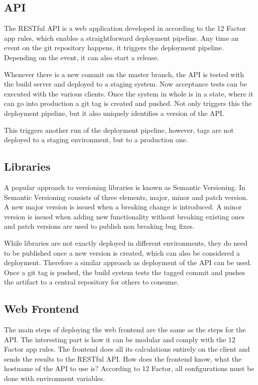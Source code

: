 \subsection{API}

The RESTful API is a web application developed in according to the 12 Factor
app rules, which enables a straightforward deployment pipeline. Any time an
event on the git repository happens, it triggers the deployment pipeline.
Depending on the event, it can also start a release.

Whenever there is a new commit on the master branch, the API is tested with the
build server and deployed to a staging system. Now acceptance tests can be
executed with the various clients. Once the system in whole is in a state,
where it can go into production a git tag is created and pushed. Not only
triggers this the deployment pipeline, but it also uniquely identifies a
version of the API.

This triggers another run of the deployment pipeline, however, tags are not
deployed to a staging environment, but to a production one.

\subsection{Libraries}

A popular approach to versioning libraries is known as Semantic Versioning. In
Semantic Versioning consists of three elements, major, minor and patch version.
A new major version is issued when a breaking change is introduced. A minor
version is issued when adding new functionality without breaking existing ones
and patch versions are used to publish non breaking bug fixes.

While libraries are not exactly deployed in different environments, they do
need to be published once a new version is created, which can also be
considered a deployment. Therefore a similar approach as deployment of the API
can be used. Once a git tag is pushed, the build system tests the tagged commit
and pushes the artifact to a central repository for others to consume.

\subsection{Web Frontend}

The main steps of deploying the web frontend are the same as the steps for the
API. The interesting part is how it can be modular and comply with the 12
Factor app rules. The frontend does all its calculations entirely on the client
and sends the results to the RESTful API. How does the frontend know, what the
hostname of the API to use is? According to 12 Factor, all configurations must
be done with environment variables.

